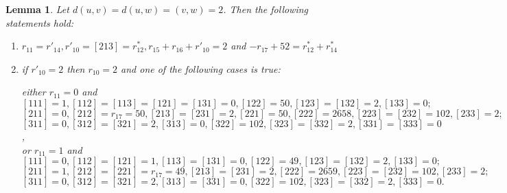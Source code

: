 \documentclass{article}
\newtheorem{lemma}{Lemma}
\theoremstyle{definition}
\theoremstyle{definition}
\theoremstyle{remark}
\begin{document}
\begin{lemma} Let $d(u, v) = d(u, w) = (v, w) = 2$. Then the following statements hold:
\begin{enumerate}
    \item $r_{11} = r'_{14}, r'_{10} = [213] = r^*_{12}, r_{15} + r_{16} + r'_{10} = 2$ and  $-r_{17} + 52 = r^*_{12} + r^*_{14}$
    \item if $r'_{10} = 2$ then $r_{10} = 2$ and one of the following cases is true:

either $r_{11} = 0$ and \\
$[111] = 1, [112] = [113] = [121] = [131] = 0, [122] = 50, [123] = [132] = 2, [133] = 0;$ \\
$[211] = 0, [212] = r_{17} = 50, [213] = [231] = 2, [221] = 50, [222] = 2658, [223] = [232] = 102, [233] = 2;$ \\
$[311] = 0, [312] = [321] = 2, [313] = 0, [322] = 102, [323] = [332] = 2, [331] = [333] = 0$,\\

or $r_{11} = 1$ and \\
$[111] = 0, [112] = [121] = 1, [113] = [131] = 0, [122] = 49, [123] = [132] = 2, [133] = 0;$ \\
$[211] = 1, [212] = [221] = r_{17} = 49, [213] = [231] = 2, [222] = 2659, [223] = [232] = 102, [233] = 2;$ \\
$[311] = 0, [312] = [321] = 2, [313] = [331] = 0, [322] = 102, [323] = [332] = 2, [333] = 0.$

\end{enumerate}

\end{lemma}
\end{document}
